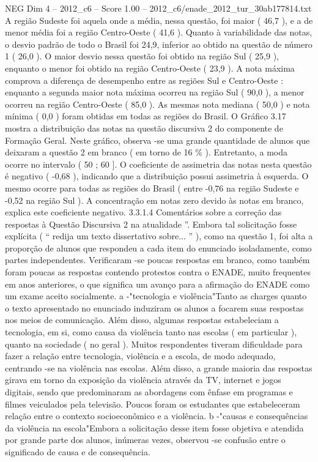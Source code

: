 \begin{textsample}{NEG Dim 4 – 2012\_c6 – Score 1.00 – 2012\_c6/enade\_2012\_tur\_30ab177814.txt}
A região Sudeste foi aquela onde a média, nessa questão, foi maior ( 46,7 ), e a de menor média foi a região Centro-Oeste ( 41,6 ).
Quanto à variabilidade das notas, o desvio padrão de todo o Brasil foi 24,9, inferior ao obtido na questão de número 1 ( 26,0 ).
O maior desvio nessa questão foi obtido na região Sul ( 25,9 ), enquanto o menor foi obtido na região Centro-Oeste ( 23,9 ).
A nota máxima comprova a diferença de desempenho entre as regiões Sul e Centro-Oeste : enquanto a segunda maior nota máxima ocorreu na região Sul ( 90,0 ), a menor ocorreu na região Centro-Oeste ( 85,0 ).
As mesmas nota mediana ( 50,0 ) e nota mínima ( 0,0 ) foram obtidas em todas as regiões do Brasil.
O Gráfico 3.17 mostra a distribuição das notas na questão discursiva 2 do componente de Formação Geral.
Neste gráfico, observa -se uma grande quantidade de alunos que deixaram a questão 2 em branco ( em torno de 16 \% ).
Entretanto, a moda ocorre no intervalo ( 50 ; 60 ].
O coeficiente de assimetria das notas nesta questão é negativo ( -0,68 ), indicando que a distribuição possui assimetria à esquerda.
O mesmo ocorre para todas as regiões do Brasil ( entre -0,76 na região Sudeste e -0,52 na região Sul ).
A concentração em notas zero devido às notas em branco, explica este coeficiente negativo. 3.3.1.4 Comentários sobre a correção das respostas à Questão Discursiva 2 na atualidade ”.
Embora tal solicitação fosse explícita ( “ redija um texto dissertativo sobre... ” ), como na questão 1, foi alta a proporção de alunos que respondeu a cada item do enunciado isoladamente, como partes independentes.
Verificaram -se poucas respostas em branco, como também foram poucas as respostas contendo protestos contra o ENADE, muito frequentes em anos anteriores, o que significa um avanço para a afirmação do ENADE como um exame aceito socialmente. a -"tecnologia e violência"Tanto as charges quanto o texto apresentado no enunciado induziram os alunos a focarem suas respostas nos meios de comunicação.
Além disso, algumas respostas estabeleciam a tecnologia, em si, como causa da violência tanto nas escolas ( em particular ), quanto na sociedade ( no geral ).
Muitos respondentes tiveram dificuldade para fazer a relação entre tecnologia, violência e a escola, de modo adequado, centrando -se na violência nas escolas.
Além disso, a grande maioria das respostas girava em torno da exposição da violência através da TV, internet e jogos digitais, sendo que predominaram as abordagens com ênfase em programas e filmes veiculados pela televisão.
Poucos foram os estudantes que estabeleceram relação entre o contexto socioeconômico e a violência. b -"causas e consequências da violência na escola"Embora a solicitação desse item fosse objetiva e atendida por grande parte dos alunos, inúmeras vezes, observou -se confusão entre o significado de causa e de consequência.

\end{textsample}
